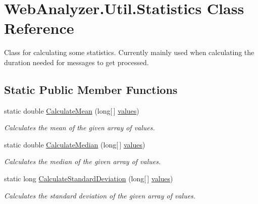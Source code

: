 \hypertarget{class_web_analyzer_1_1_util_1_1_statistics}{}\section{Web\+Analyzer.\+Util.\+Statistics Class Reference}
\label{class_web_analyzer_1_1_util_1_1_statistics}


Class for calculating some statistics. Currently mainly used when calculating the duration needed for messages to get processed.  


\subsection*{Static Public Member Functions}
\begin{DoxyCompactItemize}
\item 
static double \hyperlink{class_web_analyzer_1_1_util_1_1_statistics_a616f8ba6f61eafae6b9dcb1a86c29c54}{Calculate\+Mean} (long\mbox{[}$\,$\mbox{]} \hyperlink{_u_i_2_h_t_m_l_resources_2js_2lib_2underscore_8min_8js_aa593753ecced698b5cfa481d3ae5fcea}{values})
\begin{DoxyCompactList}\small\item\em Calculates the mean of the given array of values. \end{DoxyCompactList}\item 
static double \hyperlink{class_web_analyzer_1_1_util_1_1_statistics_a0396596f89a8b9e363b1458c963e0313}{Calculate\+Median} (long\mbox{[}$\,$\mbox{]} \hyperlink{_u_i_2_h_t_m_l_resources_2js_2lib_2underscore_8min_8js_aa593753ecced698b5cfa481d3ae5fcea}{values})
\begin{DoxyCompactList}\small\item\em Calculates the median of the given array of values. \end{DoxyCompactList}\item 
static long \hyperlink{class_web_analyzer_1_1_util_1_1_statistics_aad28ff8d54e3c4a2195c595c50d18231}{Calculate\+Standard\+Deviation} (long\mbox{[}$\,$\mbox{]} \hyperlink{_u_i_2_h_t_m_l_resources_2js_2lib_2underscore_8min_8js_aa593753ecced698b5cfa481d3ae5fcea}{values})
\begin{DoxyCompactList}\small\item\em Calculates the standard deviation of the given array of values. \end{DoxyCompactList}\end{DoxyCompactItemize}


